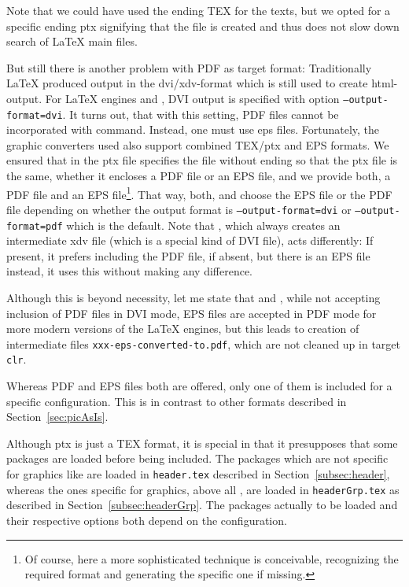 Note that we could have used the ending TEX for the texts, 
but we opted for a specific ending \gls{ptx} signifying that the file is created 
and thus does not slow down search of \LaTeX{} main files. 

But still there is another problem with PDF as target format: 
Traditionally \LaTeX{} produced output in the \gls{dvi}/\gls{xdv}-format 
which is still used to create \gls{html}-output. 
For \LaTeX{} engines \pdflatex{} and \lualatex, 
DVI output is specified with option \texttt{--output-format=dvi}. 
It turns out, that with this setting, 
PDF files cannot be incorporated with  command. 
Instead, one must use \gls{eps} files. 
Fortunately, the graphic converters used also support combined TEX/\gls{ptx} and EPS formats. 
We ensured that  in the \gls{ptx} file 
specifies the file without ending so that the \gls{ptx} file is the same, 
whether it encloses a PDF file or an EPS file,
and we provide both, a PDF file and an EPS file\footnote%
{Of course, here a more sophisticated technique is conceivable, 
recognizing the required format and generating the specific one if missing. }. 
That way, both, \pdflatex{} and \lualatex{} choose the EPS file or the PDF file 
depending on whether the output format is \texttt{--output-format=dvi} 
or \texttt{--output-format=pdf} which is the default. 
Note that \xelatex{}, which always creates an intermediate \gls{xdv} file 
(which is a special kind of DVI file), 
acts differently: If present, it prefers including the PDF file, 
if absent, but there is an EPS file instead, it uses this without making any difference. 

Although this is beyond necessity, 
let me state that \pdflatex{} and \lualatex{}, 
while not accepting inclusion of PDF files in DVI mode, 
EPS files are accepted in PDF mode for more modern versions of the \LaTeX{} engines, 
but this leads to creation of intermediate files \texttt{xxx-eps-converted-to.pdf}, 
which are not cleaned up in target \texttt{clr}. 

Whereas PDF and EPS files both are offered, 
only one of them is included for a specific configuration. 
This is in contrast to other formats described in Section~\ref{sec:picAsIs}. 

Although \gls{ptx} is just a TEX format, 
it is special in that it presupposes that some packages are loaded before being included. 
The packages which are not specific for graphics like  are loaded in \texttt{header.tex} 
described in Section~\ref{subsec:header}, 
whereas the ones specific for graphics, above all , 
are loaded in \texttt{headerGrp.tex} 
as described in Section~\ref{subsec:headerGrp}. 
The packages actually to be loaded and their respective options both depend on the configuration. 

